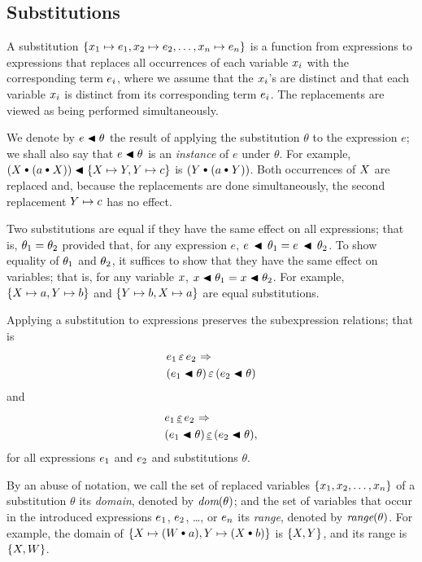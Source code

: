 \documentclass[runningheads]{llncs}
\DeclareMathOperator{\uimplies}{\Rightarrow}
\begin{document}
\subsection{Substitutions}
A substitution $\{{x}_{1} \mapsto e_{1}, {x}_{2} \mapsto e_{2}, \ldots, {x}_{n} \mapsto e_{n}\}$ is a function from expressions to expressions that replaces all occurrences of each variable ${x}_{i}$ with the corresponding term $e_{i}$, where we assume that the ${x}_{i}$'s are distinct and that each variable ${x}_{i}$ is distinct from its corresponding term $e_{i}$.  The replacements are viewed as being performed simultaneously.

We denote by $e \blacktriangleleft \theta$ the result of applying the substitution $\theta$ to the expression $e$; we shall also say that $e \blacktriangleleft \theta$ is an \emph{instance} of $e$ under $\theta$. For example, $(\var{X} \cons (a \cons \var{X})) \apply \{\var{X} \mapsto \var{Y},  \var{Y} \mapsto c\}$ is $(\var{Y} \cons (a \cons \var{Y}))$. Both occurrences of $X$ are replaced and, because the replacements are done simultaneously, the second replacement $Y \mapsto c$ has no effect.

Two substitutions are equal if they have the same effect on all expressions;  that is, $\theta_{1}=\theta_{2}$ provided that, for any expression $e$,  $e \,\blacktriangleleft\, \theta_{1} = e\, \blacktriangleleft\, \theta_{2}$.  To show equality of  $\theta_{1}$ and $\theta_{2}$, it suffices to show that they have the same effect on variables; that is, for any variable $x$, $x \blacktriangleleft \theta_{1} = x \blacktriangleleft \theta_{2}$. For example, $\{X \mapsto a,  Y \mapsto b\}$ and $\{Y \mapsto b,  X \mapsto a\}$ are equal substitutions.

Applying a substitution to expressions preserves the  subexpression relations; that is 
\begin{align*}
& \e{1} \occursin \e{2} \, \uimplies\\
& (\e{1} \apply \theta) \occursin (\e{2} \apply \theta)
\end{align*} 
and
\begin{align*}
& \e{1} \occurseq \e{2} \, \uimplies\\
& (\e{1} \apply \theta) \occurseq (\e{2} \apply \theta),
\end{align*} 
for all expressions $e_{1}$ and $e_{2}$ and substitutions $\theta$.

By an abuse of notation, we call the set of replaced variables $\{{x}_{1}, {x}_{2},\ldots, {x}_{n}\}$ of a substitution $\theta$ its \emph{domain}, denoted by $\emph{dom}(\theta)$;  and the set of variables that occur in the introduced expressions $e_{1}$, $e_{2}$, \ldots, or $e_{n}$ its \emph{range}, denoted by  $\emph{range}(\theta)$.  For example, the domain of $\{\var{X} \mapsto (\var{W} \cons a), \var{Y} \mapsto (\var{X} \cons b)\}$ is $\{X, Y\}$, and its range is $\{X, W\}$. 
\end{document}

